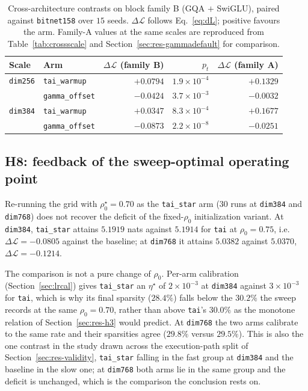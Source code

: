\documentclass[final,5p,times,twocolumn]{elsarticle}
\theoremstyle{remark}
\newcommand{\rhoz}{\rho_{0}}
\newcommand{\dL}{\Delta\mathcal{L}}
\begin{document}
\begin{table}[t]
\centering
\small
\caption{Cross-architecture contrasts on block family B (GQA $+$ SwiGLU),
paired against \texttt{bitnet158} over $15$ seeds. $\dL$ follows
Eq.~\eqref{eq:dL}; positive favours the arm. Family-A values at the same scales
are reproduced from Table~\ref{tab:crossscale} and
Section~\ref{sec:res-gammadefault} for comparison.}
\label{tab:archB}
\begin{tabular}{@{}llrrr@{}}
\toprule
Scale & Arm & $\dL$ (family B) & $p_t$ & $\dL$ (family A) \\
\midrule
\texttt{dim256} & \texttt{tai\_warmup} & $+0.0794$ & $1.9\times 10^{-4}$ & $+0.1329$ \\
& \texttt{gamma\_offset} & $-0.0424$ & $3.7\times 10^{-3}$ & $-0.0032$ \\
\texttt{dim384} & \texttt{tai\_warmup} & $+0.0347$ & $8.3\times 10^{-4}$ & $+0.1677$ \\
& \texttt{gamma\_offset} & $-0.0873$ & $2.2\times 10^{-8}$ & $-0.0251$ \\
\bottomrule
\end{tabular}
\end{table}

\subsection{H8: feedback of the sweep-optimal operating point}
\label{sec:res-h8}

Re-running the grid with $\rhoz^\star = 0.70$ as the \texttt{tai\_star} arm
($30$ runs at \texttt{dim384} and \texttt{dim768}) does not recover the deficit
of the fixed-$\rhoz$ initialization variant. At \texttt{dim384},
\texttt{tai\_star} attains $5.1919$ nats against $5.1914$ for \texttt{tai} at
$\rhoz = 0.75$, i.e.\ $\dL = -0.0805$ against the baseline; at
\texttt{dim768} it attains $5.0382$ against $5.0370$, $\dL = -0.1214$.

The comparison is not a pure change of $\rhoz$. Per-arm calibration
(Section~\ref{sec:lrcal}) gives \texttt{tai\_star} an $\eta^{\star}$ of
$2\times 10^{-3}$ at \texttt{dim384} against $3\times 10^{-3}$ for
\texttt{tai}, which is why its final sparsity ($28.4\%$) falls below the
$30.2\%$ the sweep records at the same $\rhoz = 0.70$, rather than above
\texttt{tai}'s $30.0\%$ as the monotone relation of
Section~\ref{sec:res-h3} would predict. At \texttt{dim768} the two arms
calibrate to the same rate and their sparsities agree ($29.8\%$ versus
$29.5\%$). This is also the one contrast in the study drawn across the
execution-path split of Section~\ref{sec:res-validity}, \texttt{tai\_star}
falling in the fast group at \texttt{dim384} and the baseline in the slow one;
at \texttt{dim768} both arms lie in the same group and the deficit is
unchanged, which is the comparison the conclusion rests on.
\end{document}
